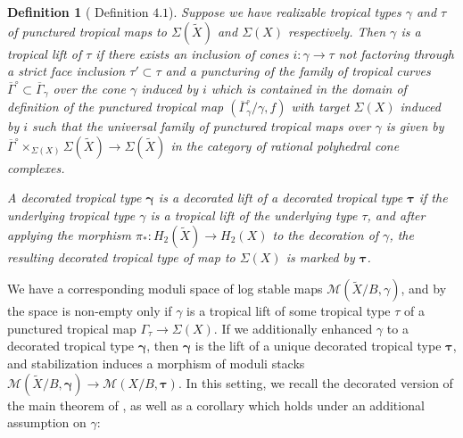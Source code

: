 \documentclass[12pt, oneside]{amsart}   	%
\newcounter{thm}
\newtheorem{definition}[thm]{Definition}
\numberwithin{equation}{section}
\numberwithin{thm}{section}
\numberwithin{figure}{section}
\begin{document}
\begin{definition}[\cite{pbirinv} Definition $4.1$]\label{dtlift}
Suppose we have realizable tropical types $\gamma$ and $\tau$ of punctured tropical maps to $\Sigma(\widetilde{X})$ and $\Sigma(X)$ respectively. Then $\gamma$ is a tropical lift of $\tau$ if there exists an inclusion of cones $i: \gamma \rightarrow \tau$ not factoring through a strict face inclusion $\tau' \subset \tau$ and a puncturing of the family of tropical curves $\overline{\Gamma}^\circ\subset \overline{\Gamma}_{\gamma}$ over the cone $\gamma$ induced by $i$ which is contained in the domain of definition of the punctured tropical map $(\overline{\Gamma}_{\gamma}^{\circ}/\gamma,f)$ with target $\Sigma(X)$ induced by $i$ such that the universal family of punctured tropical maps over $\gamma$ is given by $\overline{\Gamma}^\circ \times_{\Sigma(X)} \Sigma(\tilde{X}) \rightarrow \Sigma(\widetilde{X})$ in the category of rational polyhedral cone complexes.

A decorated tropical type $\pmb\gamma$ is a \emph{decorated lift} of a decorated tropical type $\pmb\tau$ if the underlying tropical type $\gamma$ is a tropical lift of the underlying type $\tau$, and after applying the morphism $\pi_*:H_2(\widetilde{X}) \rightarrow H_2(X)$ to the decoration of $\gamma$, the resulting decorated tropical type of map to $\Sigma(X)$ is marked by $\pmb\tau$. 
\end{definition}



We have a corresponding moduli space of log stable maps $\mathscr{M}(\widetilde{X}/B,\gamma)$, and by \cite[Theorem $4.6$]{pbirinv} the space is non-empty only if $\gamma$ is a tropical lift of some tropical type $\tau$ of a punctured tropical map $\Gamma_{\tau} \rightarrow \Sigma(X)$. If we additionally enhanced $\gamma$ to a decorated tropical type $\pmb\gamma$, then $\pmb\gamma$ is the lift of a unique decorated tropical type $\pmb\tau$, and stabilization induces a morphism of moduli stacks $\mathscr{M}(\widetilde{X}/B,\pmb\gamma) \rightarrow \mathscr{M}(X/B,\pmb\tau)$. In this setting, we recall the decorated version of the main theorem of \cite{pbirinv}, as well as a corollary which holds under an additional assumption on $\gamma$:
\end{document}
